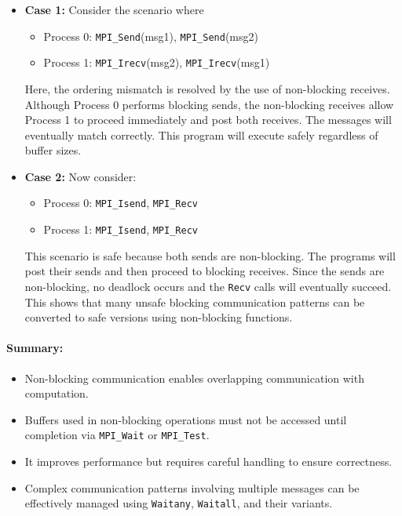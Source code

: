 \documentclass[12pt]{book}
\begin{document}
\begin{itemize}
    \item \textbf{Case 1:} Consider the scenario where
    \begin{itemize}
        \item Process 0: \texttt{MPI\_Send}(msg1), \texttt{MPI\_Send}(msg2)
        \item Process 1: \texttt{MPI\_Irecv}(msg2), \texttt{MPI\_Irecv}(msg1)
    \end{itemize}
    
    Here, the ordering mismatch is resolved by the use of non-blocking receives. Although Process 0 performs blocking sends, the non-blocking receives allow Process 1 to proceed immediately and post both receives. The messages will eventually match correctly. This program will execute safely regardless of buffer sizes.

    \item \textbf{Case 2:} Now consider:
    \begin{itemize}
        \item Process 0: \texttt{MPI\_Isend}, \texttt{MPI\_Recv}
        \item Process 1: \texttt{MPI\_Isend}, \texttt{MPI\_Recv}
    \end{itemize}
    
    This scenario is safe because both sends are non-blocking. The programs will post their sends and then proceed to blocking receives. Since the sends are non-blocking, no deadlock occurs and the \texttt{Recv} calls will eventually succeed. This shows that many unsafe blocking communication patterns can be converted to safe versions using non-blocking functions.
\end{itemize}

\paragraph{Summary:}
\begin{itemize}
    \item Non-blocking communication enables overlapping communication with computation.
    \item Buffers used in non-blocking operations must not be accessed until completion via \texttt{MPI\_Wait} or \texttt{MPI\_Test}.
    \item It improves performance but requires careful handling to ensure correctness.
    \item Complex communication patterns involving multiple messages can be effectively managed using \texttt{Waitany}, \texttt{Waitall}, and their variants.
\end{itemize}
\end{document}
